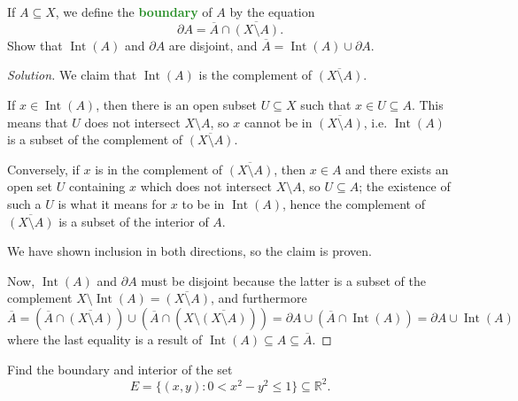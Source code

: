 \documentclass[10pt]{article}
\providecommand{\ol}{\overline}
\providecommand{\RR}{\mathbb R}
\newenvironment{soln}{\begin{proof}[Solution]}{\end{proof}}
\providecommand{\vocab}[1]{{\textbf{\textcolor{ForestGreen}{#1}}}}
\begin{document}
\begin{problem}
    [Munkres 17.19a]
    If $A\subseteq X$, we define the \vocab{boundary} of $A$ by the equation
    \begin{equation*}
	\partial A = \ol A\cap\ol{(X\setminus A)}.
    \end{equation*}
    Show that $\operatorname{Int}(A)$ and $\partial A$ are disjoint,
    and $\ol A = \operatorname{Int}(A)\cup\partial A$.
\end{problem}

\begin{soln}
    We claim that $\operatorname{Int}(A)$ is the complement of
    $\ol{(X\setminus A)}$. 

    If $x\in\operatorname{Int}(A)$, then there is an open subset
    $U\subseteq X$ such that $x\in U\subseteq A$.
    This means that $U$ does not intersect $X\setminus A$,
    so $x$ cannot be in $\ol{(X\setminus A)}$, i.e.
    $\operatorname{Int}(A)$ is a subset of the complement of
    $\ol{(X\setminus A)}$.

    Conversely, if $x$ is in the complement of $\ol{(X\setminus A)}$,
    then $x\in A$ and there exists an open set $U$ containing $x$
    which does not intersect $X\setminus A$, so $U\subseteq A$;
    the existence of such a $U$ is what it means for $x$ to be in
    $\operatorname{Int}(A)$, hence the complement of $\ol{(X\setminus A)}$
    is a subset of the interior of $A$.

    We have shown inclusion in both directions, so the claim is proven.

    Now, $\operatorname{Int}(A)$ and $\partial A$ must be disjoint
    because the latter is a subset of the complement
    $X\setminus \operatorname{Int}(A) = \ol{(X\setminus A)}$,
    and furthermore
    \begin{equation*}
	\ol A = (\ol A \cap\ol{(X\setminus A)})
	\cup (\ol A \cap(X\setminus \ol{(X\setminus A)}))
	= \partial A \cup (\ol A \cap \operatorname{Int}(A))
	= \partial A \cup \operatorname{Int}(A)
    \end{equation*}
    where the last equality is a result of
    $\operatorname{Int}(A)\subseteq A\subseteq \ol A$.
\end{soln}

\pagebreak

\begin{problem}
    [Munkres 17.20e]
    Find the boundary and interior of the set
    \begin{equation*}
	E = \{(x,y) : 0 < x^2-y^2 \le 1\}\subseteq\RR^2.
    \end{equation*}
\end{problem}
\end{document}
